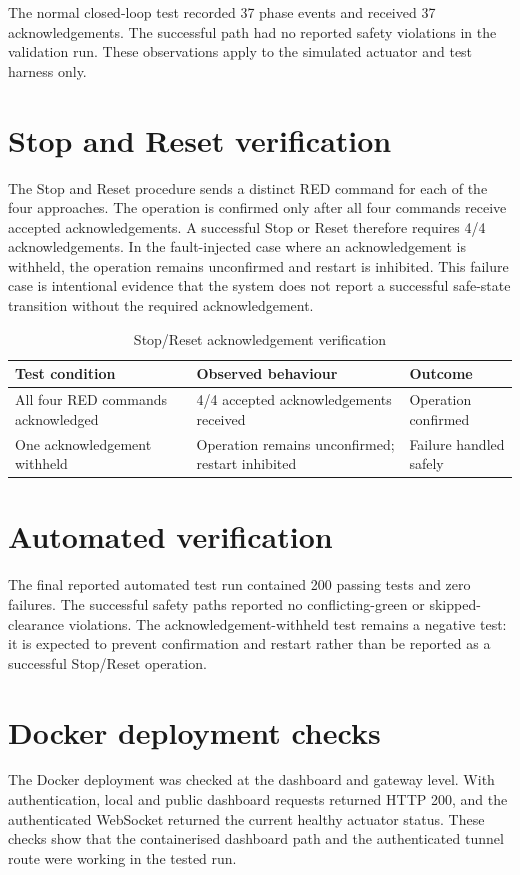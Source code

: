 \documentclass[12pt,a4paper,oneside]{report}
\begin{document}
The normal closed-loop test recorded 37 phase events and received 37 acknowledgements. The successful path had no reported safety violations in the validation run. These observations apply to the simulated actuator and test harness only.

\section{Stop and Reset verification}
The Stop and Reset procedure sends a distinct RED command for each of the four approaches. The operation is confirmed only after all four commands receive accepted acknowledgements. A successful Stop or Reset therefore requires 4/4 acknowledgements. In the fault-injected case where an acknowledgement is withheld, the operation remains unconfirmed and restart is inhibited. This failure case is intentional evidence that the system does not report a successful safe-state transition without the required acknowledgement.

\begin{table}[htbp]\centering\small
\caption{Stop/Reset acknowledgement verification}\label{tab:stop-reset}
\begin{tabular}{|p{}|p{}|p{}|}\hline
\textbf{Test condition} & \textbf{Observed behaviour} & \textbf{Outcome} \\\hline
All four RED commands acknowledged & 4/4 accepted acknowledgements received & Operation confirmed \\\hline
One acknowledgement withheld & Operation remains unconfirmed; restart inhibited & Failure handled safely \\\hline
\end{tabular}\end{table}

\section{Automated verification}
The final reported automated test run contained 200 passing tests and zero failures. The successful safety paths reported no conflicting-green or skipped-clearance violations. The acknowledgement-withheld test remains a negative test: it is expected to prevent confirmation and restart rather than be reported as a successful Stop/Reset operation.

\section{Docker deployment checks}
The Docker deployment was checked at the dashboard and gateway level. With authentication, local and public dashboard requests returned HTTP 200, and the authenticated WebSocket returned the current healthy actuator status. These checks show that the containerised dashboard path and the authenticated tunnel route were working in the tested run.
\end{document}
